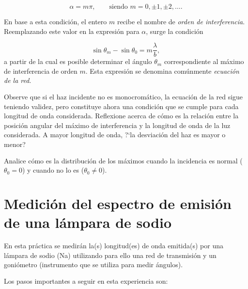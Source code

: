\documentclass[laboratorio]{guia}
\begin{document}
\begin{equation}
    \alpha = m \pi, \quad \quad \text{siendo } m = 0, \pm 1, \pm 2, \ldots.
\end{equation}

En base a esta condici\'on, el entero $m$ recibe el nombre de {\it orden de
interferencia}. Reemplazando este valor en la expresi\'on para $\alpha$, 
surge la condici\'on

\begin{equation}
    \sin \theta_m - \sin \theta_0 = m \frac{\lambda}{b},
\end{equation}
a partir de la cual es posible determinar el \'angulo $\theta_m$ 
correspondiente al m\'aximo de interferencia de orden $m$. Esta expresi\'on
se denomina com\'unmente {\it ecuaci\'on de la red}. 

Observe que si el haz incidente no es monocrom\'atico, la ecuaci\'on de la
red sigue teniendo validez, pero constituye ahora una condici\'on que se
cumple para cada longitud de onda considerada. Reflexione acerca de c\'omo es
la relaci\'on entre la posici\'on angular del m\'aximo de interferencia y la
longitud de onda de la luz considerada. A mayor longitud de onda, ?`la 
desviaci\'on del haz es mayor o menor?

Analice c\'omo es la distribuci\'on de los m\'aximos cuando la incidencia 
es normal ($\theta_0 = 0$) y cuando no lo es ($\theta_0 \neq 0$). 

\section{Medici\'on del espectro de emisi\'on de una l\'ampara de sodio}

En esta pr\'actica se medir\'an la(s) longitud(es) de onda emitida(s) por una
l\'ampara de sodio (Na) utilizando para ello una red de transmisi\'on y un 
goni\'ometro (instrumento que se utiliza para medir \'angulos).

Los pasos importantes a seguir en esta experiencia son:
\end{document}
